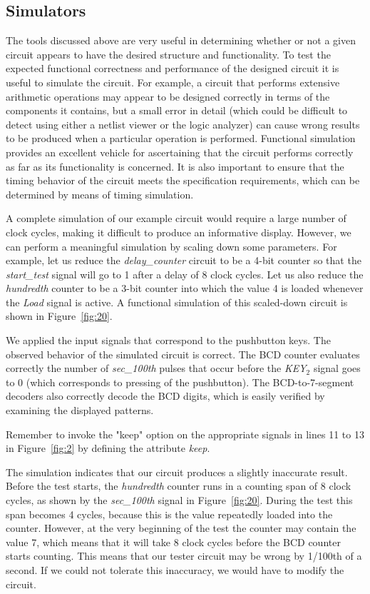 \documentclass[11pt, twoside, pdftex]{article}
\begin{document}
\subsection{Simulators}
The tools discussed above are very useful in determining whether or not a
given circuit appears to have the desired structure and functionality.
To test the expected functional correctness and performance of the designed
circuit it is useful to simulate the circuit. For example, a circuit that
performs extensive arithmetic operations may appear to be designed correctly
in terms of the components it contains, but a small error in detail (which 
could be difficult to detect using either a netlist viewer or the logic analyzer)
can cause wrong results to be produced when a particular operation is performed.
Functional simulation provides an excellent vehicle for ascertaining that the
circuit performs correctly as far as its functionality is concerned. It is
also important to ensure that the timing behavior of the circuit meets the
specification requirements, which can be determined by means of timing simulation.

A complete simulation of our example circuit would require a large number of
clock cycles, making it difficult to produce an informative display.
However, we can perform a meaningful simulation by scaling down 
some parameters. For example, let us reduce the {\it delay\_counter} circuit
to be a 4-bit counter so that the {\it start\_test} signal will go to 1 after
a delay of 8 clock cycles. Let us also reduce the {\it hundredth} counter
to be a 3-bit counter into which the value 4 is loaded whenever the {\it Load}
signal is active. A functional simulation of this scaled-down circuit is
shown in Figure~\ref{fig:20}.

We applied the input signals that correspond to the pushbutton keys. The observed
behavior of the simulated circuit is correct. The BCD counter evaluates correctly
the number of {\it sec\_100th} pulses that occur before the {\it KEY}$_2$
signal goes to 0 (which corresponds to pressing of the pushbutton).
The BCD-to-7-segment decoders also correctly decode the BCD digits, which
is easily verified by examining the displayed patterns.

Remember to invoke the "keep" option on the appropriate signals in lines 11 to 13 in Figure~\ref{fig:2}
by defining the attribute {\it keep}.

The simulation indicates that our circuit produces a slightly inaccurate result.
Before the test starts, the {\it hundredth} counter runs in a counting span
of 8 clock cycles, as shown by the {\it sec\_100th} signal in Figure~\ref{fig:20}.
During the test this span becomes 4 cycles, because this is
the value repeatedly loaded into the counter. However, at the very beginning of
the test the counter may contain the value 7, which means that it will take 8
clock cycles before the BCD counter starts counting. This means that our tester
circuit may be wrong by 1/100th of a second. If we could not tolerate this
inaccuracy, we would have to modify the circuit.
\end{document}
